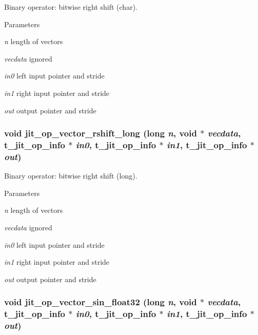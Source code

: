 Binary operator: bitwise right shift (char). 
\begin{DoxyParams}{Parameters}
\item[{\em n}]length of vectors \item[{\em vecdata}]ignored \item[{\em in0}]left input pointer and stride \item[{\em in1}]right input pointer and stride \item[{\em out}]output pointer and stride \end{DoxyParams}
\hypertarget{group__opvecmod_gab1d87cd5a79ba9d336d75442d996c7b4}{
\subsubsection[{jit\_\-op\_\-vector\_\-rshift\_\-long}]{\setlength{\rightskip}{0pt plus 5cm}void jit\_\-op\_\-vector\_\-rshift\_\-long (long {\em n}, \/  void $\ast$ {\em vecdata}, \/  {\bf t\_\-jit\_\-op\_\-info} $\ast$ {\em in0}, \/  {\bf t\_\-jit\_\-op\_\-info} $\ast$ {\em in1}, \/  {\bf t\_\-jit\_\-op\_\-info} $\ast$ {\em out})}}
\label{group__opvecmod_gab1d87cd5a79ba9d336d75442d996c7b4}


Binary operator: bitwise right shift (long). 
\begin{DoxyParams}{Parameters}
\item[{\em n}]length of vectors \item[{\em vecdata}]ignored \item[{\em in0}]left input pointer and stride \item[{\em in1}]right input pointer and stride \item[{\em out}]output pointer and stride \end{DoxyParams}
\hypertarget{group__opvecmod_ga429cbb18b30dddf38c26e3c40af428d6}{
\subsubsection[{jit\_\-op\_\-vector\_\-sin\_\-float32}]{\setlength{\rightskip}{0pt plus 5cm}void jit\_\-op\_\-vector\_\-sin\_\-float32 (long {\em n}, \/  void $\ast$ {\em vecdata}, \/  {\bf t\_\-jit\_\-op\_\-info} $\ast$ {\em in0}, \/  {\bf t\_\-jit\_\-op\_\-info} $\ast$ {\em in1}, \/  {\bf t\_\-jit\_\-op\_\-info} $\ast$ {\em out})}}
\label{group__opvecmod_ga429cbb18b30dddf38c26e3c40af428d6}


